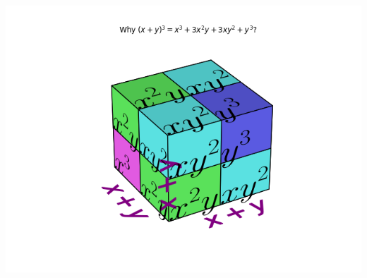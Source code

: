 \documentclass{article}
\begin{document}
\begin{minipage}[b]{0.45\linewidth}
\includegraphics[width=\textwidth]{recipe3}
\end{minipage}
\hspace{\fill}
\end{document}
